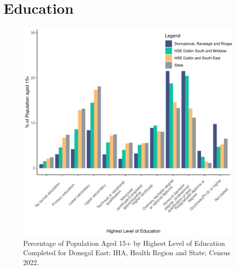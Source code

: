\documentclass{article}
\begin{document}
\section{Education}\label{sect:Edu}
\begin{figure}[H]
	\centering
	\includegraphics[width = 120mm]{../figures/EduED.pdf}
	\caption{Percentage of Population Aged 15+ by Highest Level of Education Completed for Donegal East; IHA, Health Region and State; Census 2022.}
	\label{fig:vbnv}
	\end{figure}
\end{document}
